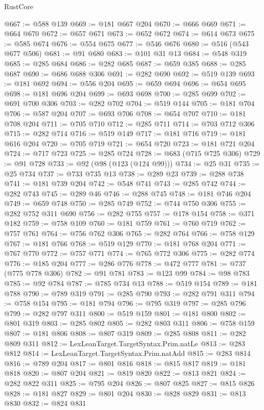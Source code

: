 \begin{lexlean}{RustCore}
\begin{coremodule}
@667 := @588 @139
@669 := @181 @667 @204
@670 := @666 @669
@671 := @664 @670
@672 := @657 @671
@673 := @652 @672
@674 := @614 @673
@675 := @585 @674
@676 := @554 @675
@677 := @546 @676
@680 := @516 (@543 @677 @506)
@681 := @91 @680
@683 := @101 @31 @13
@684 := @548 @319
@685 := @285 @684
@686 := @282 @685
@687 := @659 @385
@688 := @285 @687
@690 := @686 @688 @306
@691 := @282 @690
@692 := @519 @139
@693 := @181 @692
@694 := @556 @204
@695 := @659 @694
@696 := @654 @695
@698 := @181 @696 @204
@699 := @693 @698
@700 := @285 @699
@702 := @691 @700 @306
@703 := @282 @702
@704 := @519 @144
@705 := @181 @704
@706 := @587 @204
@707 := @693 @706
@708 := @654 @707
@710 := @181 @708 @204
@711 := @705 @710
@712 := @285 @711
@714 := @703 @712 @306
@715 := @282 @714
@716 := @519 @149
@717 := @181 @716
@719 := @181 @616 @204
@720 := @705 @719
@721 := @654 @720
@723 := @181 @721 @204
@724 := @717 @723
@725 := @285 @724
@728 := @683 (@715 @725 @306)
@729 := @91 @728
@733 := @92 (@98 (@123 (@124 @99)))
@734 := @25 @31
@735 := @25 @734
@737 := @733 @735 @13
@738 := @289 @23
@739 := @288 @738
@741 := @181 @739 @204
@742 := @548 @741
@743 := @285 @742
@744 := @282 @743
@745 := @289 @46
@746 := @288 @745
@748 := @181 @746 @204
@749 := @659 @748
@750 := @285 @749
@752 := @744 @750 @306
@755 := @282 @752 @311 @690
@756 := @282 @755
@757 := @178 @154
@758 := @371 @182
@759 := @758 @109
@760 := @181 @759
@761 := @760 @719
@762 := @757 @761
@764 := @756 @762 @306
@765 := @282 @764
@766 := @758 @129
@767 := @181 @766
@768 := @519 @129
@770 := @181 @768 @204
@771 := @767 @770
@772 := @757 @771
@774 := @765 @772 @306
@775 := @282 @774
@776 := @185 @204
@777 := @286 @776
@778 := @472 @777
@781 := @737 (@775 @778 @306)
@782 := @91 @781
@783 := @123 @99
@784 := @98 @783
@785 := @92 @784
@787 := @785 @734 @13
@788 := @519 @154
@789 := @181 @788
@790 := @789 @319
@791 := @285 @790
@793 := @282 @791 @311
@794 := @758 @154
@795 := @181 @794
@796 := @795 @319
@797 := @285 @796
@799 := @282 @797 @311
@800 := @519 @159
@801 := @181 @800
@802 := @801 @319
@803 := @285 @802
@805 := @282 @803 @311
@806 := @758 @159
@807 := @181 @806
@808 := @807 @319
@809 := @285 @808
@811 := @282 @809 @311
@812 := LexLeanTarget.TargetSyntax.Prim.natLe
@813 := @283 @812
@814 := LexLeanTarget.TargetSyntax.Prim.natAdd
@815 := @283 @814
@816 := @789 @204
@817 := @801 @816
@818 := @815 @817
@819 := @181 @818
@820 := @807 @204
@821 := @819 @820
@822 := @813 @821
@824 := @282 @822 @311
@825 := @795 @204
@826 := @807 @825
@827 := @815 @826
@828 := @181 @827
@829 := @801 @204
@830 := @828 @829
@831 := @813 @830
@832 := @824 @831

\end{coremodule}
\end{lexlean}
